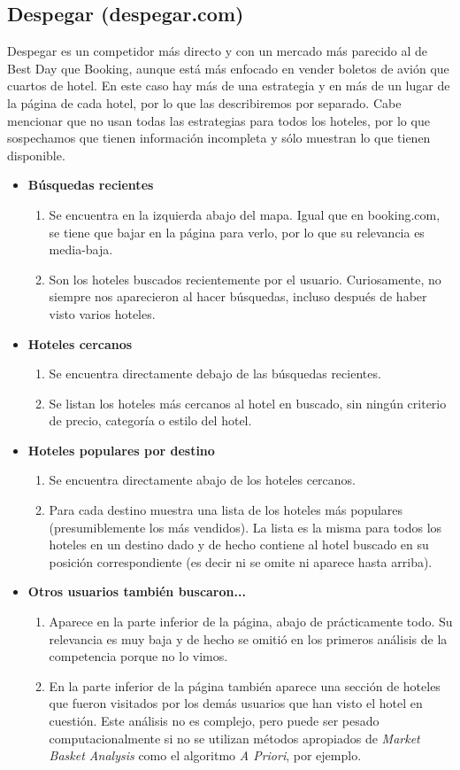 \documentclass[12pt]{report}
\begin{document}
\subsection*{Despegar (despegar.com)}

Despegar es un competidor más directo y con un mercado más parecido al de Best Day que Booking, aunque está más enfocado en vender boletos de avión que cuartos de hotel. En este caso hay más de una estrategia y en más de un lugar de la página de cada hotel, por lo que las describiremos por separado. Cabe mencionar que no usan todas las estrategias para todos los hoteles, por lo que sospechamos que tienen información incompleta y sólo muestran lo que tienen disponible.
\begin{itemize}
	\item \textbf{Búsquedas recientes}
	\begin{enumerate}
		\item Se encuentra en la izquierda abajo del mapa. Igual que en booking.com, se tiene que bajar en la página para verlo, por lo que su relevancia es media-baja.
		\item Son los hoteles buscados recientemente por el usuario. Curiosamente, no siempre nos aparecieron al hacer búsquedas, incluso después de haber visto varios hoteles.
	\end{enumerate}
	\item \textbf{Hoteles cercanos}
	\begin{enumerate}
		\item Se encuentra directamente debajo de las búsquedas recientes.
		\item Se listan los hoteles más cercanos al hotel en buscado, sin ningún criterio de precio, categoría o estilo del hotel.
	\end{enumerate}
		\item \textbf{Hoteles populares por destino}
	\begin{enumerate}
		\item Se encuentra directamente abajo de los hoteles cercanos.
		\item Para cada destino muestra una lista de los hoteles más populares (presumiblemente los más vendidos). La lista es la misma para todos los hoteles en un destino dado y de hecho contiene al hotel buscado en su posición correspondiente (es decir ni se omite ni aparece hasta arriba).
	\end{enumerate}
	\item \textbf{Otros usuarios también buscaron...}
	\begin{enumerate}
		\item Aparece en la parte inferior de la página, abajo de prácticamente todo. Su relevancia es muy baja y de hecho se omitió en los primeros análisis de la competencia porque no lo vimos.
		\item En la parte inferior de la página también aparece una sección de hoteles que fueron visitados por los demás usuarios que han visto el hotel en cuestión. Este análisis no es complejo, pero puede ser pesado computacionalmente si no se utilizan métodos apropiados de \emph{Market Basket Analysis} como el algoritmo \emph{A Priori}, por ejemplo.
	\end{enumerate}
\end{itemize}
\end{document}
